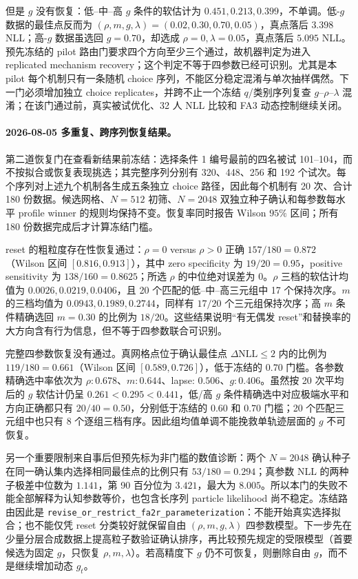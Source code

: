 但是 $g$ 没有恢复：低--中--高 $g$ 条件的软估计为 $0.451,0.213,0.399$，不单调。低-$g$ 数据的最佳点反而为 $(\rho,m,g,\lambda)=(0.02,0.30,0.70,0.05)$，真点落后 $3.398$ NLL；高-$g$ 数据虽选回 $g=0.70$，却选成 $\rho=0,\lambda=0.05$，真点落后 $5.095$ NLL。预先冻结的 pilot 路由门要求四个方向至少三个通过，故机器判定为进入 replicated mechanism recovery；这个判定不等于四参数已经可识别。尤其是本 pilot 每个机制只有一条随机 choice 序列，不能区分稳定混淆与单次抽样偶然。下一门必须增加独立 choice replicates，并跨不止一个冻结 $q$/类别序列复查 $g$--$\rho$--$\lambda$ 混淆；在该门通过前，真实被试优化、32 人 NLL 比较和 FA3 动态控制继续关闭。

\paragraph{2026-08-05 多重复、跨序列恢复结果。}
第二道恢复门在查看新结果前冻结：选择条件 1 编号最前的四名被试 101--104，而不按拟合或恢复表现挑选；其完整序列分别有 320、448、256 和 192 个试次。每个序列对上述九个机制各生成五条独立 choice 路径，因此每个机制有 20 次、合计 180 份数据。候选网格、$N=512$ 初筛、$N=2048$ 双独立种子确认和每参数每水平 profile winner 的规则均保持不变。恢复率同时报告 Wilson $95\%$ 区间；所有 180 份数据完成后才计算冻结门槛。

reset 的粗粒度存在性恢复通过：$\rho=0$ versus $\rho>0$ 正确 $157/180=0.872$（Wilson 区间 $[0.816,0.913]$），其中 zero specificity 为 $19/20=0.95$，positive sensitivity 为 $138/160=0.8625$；所选 $\rho$ 的中位绝对误差为 0。$\rho$ 三档的软估计均值为 $0.0026,0.0219,0.0406$，且 20 个匹配的低--中--高三元组中 17 个保持次序。$m$ 的三档均值为 $0.0943,0.1989,0.2744$，同样有 $17/20$ 个三元组保持次序；高 $m$ 条件精确选回 $m=0.30$ 的比例为 $18/20$。这些结果说明“有无偶发 reset”和替换率的大方向含有行为信息，但不等于四参数联合可识别。

完整四参数恢复没有通过。真网格点位于确认最佳点 $\Delta\mathrm{NLL}\leq2$ 内的比例为 $119/180=0.661$（Wilson 区间 $[0.589,0.726]$），低于冻结的 $0.70$ 门槛。各参数精确选中率依次为 $\rho:0.678$、$m:0.644$、lapse: $0.506$、$g:0.406$。虽然按 20 次平均后的 $g$ 软估计仍呈 $0.261<0.295<0.441$，低/高 $g$ 条件精确选中对应极端水平和方向正确都只有 $20/40=0.50$，分别低于冻结的 $0.60$ 和 $0.70$ 门槛；20 个匹配三元组中也只有 8 个逐组三档有序。因此组均值单调不能挽救单轨迹层面的 $g$ 不可恢复。

另一个重要限制来自事后但预先标为非门槛的数值诊断：两个 $N=2048$ 确认种子在同一确认集内选择相同最佳点的比例只有 $53/180=0.294$；真参数 NLL 的两种子极差中位数为 $1.141$，第 90 百分位为 $3.421$，最大为 $8.005$。所以本门的失败不能全部解释为认知参数等价，也包含长序列 particle likelihood 尚不稳定。冻结路由因此是 \texttt{revise\_or\_restrict\_fa2r\_parameterization}：不能开始真实选择拟合；也不能仅凭 reset 分类较好就保留自由 $(\rho,m,g,\lambda)$ 四参数模型。下一步先在少量分层合成数据上提高粒子数验证确认排序，再比较预先规定的受限模型（首要候选为固定 $g$，只恢复 $\rho,m,\lambda$）。若高精度下 $g$ 仍不可恢复，则删除自由 $g$，而不是继续增加动态 $g_t$。

